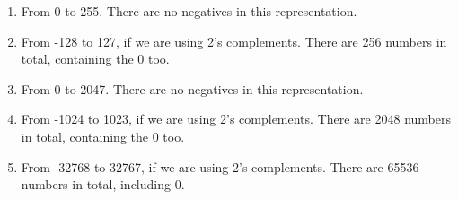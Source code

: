 \documentclass[a4paper]{article}
\begin{document}
\begin{enumerate}[label=(\alph*)]
	\item From 0 to 255. There are no negatives in this representation.
	\item From -128 to 127, if we are using 2's complements. There are 256 numbers in total, containing the 0 too.
	\item From 0 to 2047. There are no negatives in this representation.
	\item From -1024 to 1023, if we are using 2's complements. There are 2048 numbers in total, containing the 0 too.
	\item From -32768 to 32767, if we are using 2's complements. There are 65536 numbers in total, including 0.
\end{enumerate}
\end{document}
